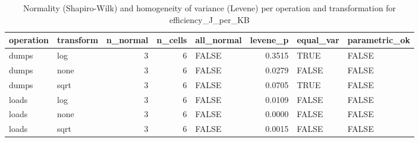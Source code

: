 \begin{table}[ht]
\centering
\begin{tabular}{llrrlrll}
  \toprule
operation & transform & n\_normal & n\_cells & all\_normal & levene\_p & equal\_var & parametric\_ok \\ 
  \midrule
dumps & log &     3 &     6 & FALSE & 0.3515 & TRUE & FALSE \\ 
  dumps & none &     3 &     6 & FALSE & 0.0279 & FALSE & FALSE \\ 
  dumps & sqrt &     3 &     6 & FALSE & 0.0705 & TRUE & FALSE \\ 
  loads & log &     3 &     6 & FALSE & 0.0109 & FALSE & FALSE \\ 
  loads & none &     3 &     6 & FALSE & 0.0000 & FALSE & FALSE \\ 
  loads & sqrt &     3 &     6 & FALSE & 0.0015 & FALSE & FALSE \\ 
   \bottomrule
\end{tabular}
\caption{Normality (Shapiro-Wilk) and homogeneity of variance (Levene) per operation and transformation for efficiency_J_per_KB} 
\label{tab:assumptions_summary_RQ1_1_efficiency}
\end{table}
